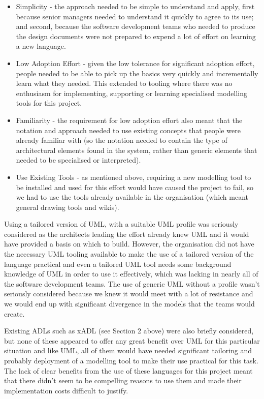   \begin{itemize}

\item Simplicity - the approach needed to be simple to understand and apply, first because senior managers needed to understand it quickly to agree to its use; and second, because the software development teams who needed to produce the design documents were not prepared to expend a lot of effort on learning a new language.

\item Low Adoption Effort - given the low tolerance for significant adoption effort, people needed to be able to pick up the basics very quickly and incrementally learn what they needed.  This extended to tooling where there was no enthusiasm for implementing, supporting or learning specialised modelling tools for this project.

\item Familiarity - the requirement for low adoption effort also meant that the notation and approach needed to use existing concepts that people were already familiar with (so the notation needed to contain the type of architectural elements found in the system, rather than generic elements that needed to be specialised or interpreted).

\item Use Existing Tools - as mentioned above, requiring a new modelling tool to be installed and used for this effort would have caused the project to fail, so we had to use the tools already available in the organisation (which meant general drawing tools and wikis).

  \end{itemize}


  Using a tailored version of UML, with a suitable UML profile was seriously considered as the architects leading the effort already knew UML and it would have provided a basis on which to build.  However, the organisation did not have the necessary UML tooling available to make the use of a tailored version of the language practical and even a tailored UML tool needs some background knowledge of UML in order to use it effectively, which was lacking in nearly all of the software development teams.  The use of generic UML without a profile wasn't seriously considered because we knew it would meet with a lot of resistance and we would end up with significant divergence in the models that the teams would create.

  Existing ADLs such as xADL (see Section 2 above) were also briefly considered, but none of these appeared to offer any great benefit over UML for this particular situation and like UML, all of them would have needed significant tailoring and probably deployment of a modelling tool to make their use practical for this task.  The lack of clear benefits from the use of these languages for this project meant that there didn't seem to be compelling reasons to use them and made their implementation costs difficult to justify.

